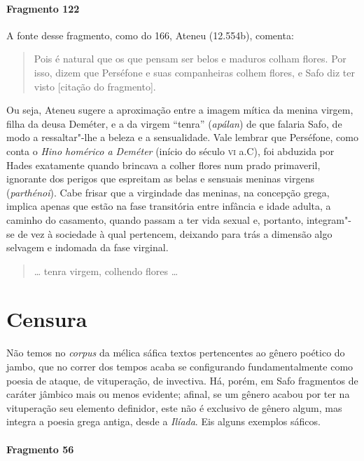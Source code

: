 \paragraph{Fragmento 122}

{\small A fonte desse fragmento, como do 166, Ateneu (12.554b), comenta: 

\begin{quote}
Pois é natural
que os que pensam ser belos e maduros colham flores. Por isso, dizem que
Perséfone e suas companheiras colhem flores, e Safo diz ter visto 
[citação do fragmento].
\end{quote}

 Ou seja, Ateneu sugere a aproximação entre a imagem
mítica da menina virgem, filha da deusa Deméter, e a da virgem ``tenra”
(\textit{apálan}) de que falaria Safo, de modo a ressaltar"-lhe a beleza e a
sensualidade. Vale lembrar que Perséfone, como conta o \textit{Hino homérico a Deméter} 
(início do século \textsc{vi} a.C), foi abduzida por Hades exatamente
quando brincava a colher flores num prado primaveril, ignorante dos perigos que
espreitam as belas e sensuais meninas virgens (\textit{parthénoi}). Cabe frisar que a virgindade das
meninas, na concepção grega, implica
apenas que estão na fase transitória entre infância e idade
adulta, a caminho do casamento, quando passam a ter vida sexual e, portanto, integram"-se
de vez à sociedade à qual pertencem, deixando para trás a dimensão algo
selvagem e indomada da fase virginal.}

\begin{verse}
\ldots{} tenra virgem, colhendo flores \ldots{}
\end{verse}


\section{Censura}

Não temos no \textit{corpus }da mélica sáfica textos pertencentes ao gênero
poético do jambo, que no correr dos tempos acaba se configurando fundamentalmente como poesia de
ataque, de vituperação, de invectiva. Há, porém, em Safo
fragmentos de caráter jâmbico mais ou menos evidente; afinal, se um gênero
acabou por ter na vituperação seu elemento definidor, este não é exclusivo de
gênero algum, mas integra a poesia grega antiga, desde a \textit{Ilíada}. Eis
alguns exemplos sáficos.

\paragraph{Fragmento 56}

